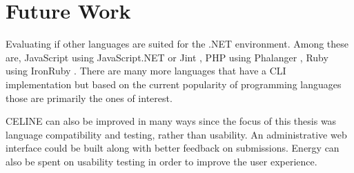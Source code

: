 \section{Future Work}

Evaluating if other languages are suited for the .NET environment. Among these are, JavaScript using JavaScript.NET \cite{JavaScript.NET} or Jint \cite{Jint}, PHP using Phalanger \cite{Phalanger}, Ruby using IronRuby \cite{IronRuby}. There are many more languages that have a CLI implementation but based on the current popularity of programming languages \cite{Tiobe} those are primarily the ones of interest.

CELINE can also be improved in many ways since the focus of this thesis was language compatibility and testing, rather than usability. An administrative web interface could be built along with better feedback on submissions. Energy can also be spent on usability testing in order to improve the user experience.